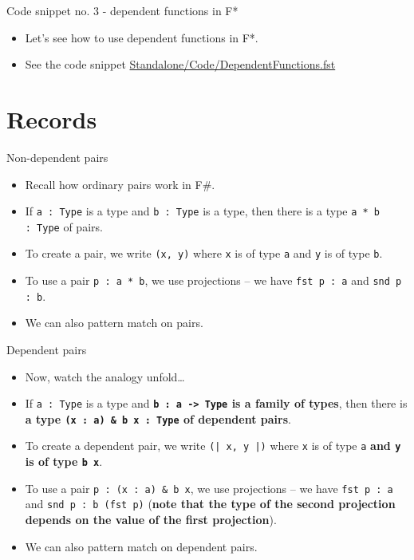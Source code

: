 \documentclass{beamer}
\newcommand{\m}[1]{\texttt{#1}}
\begin{document}
\begin{frame}{Code snippet no. 3 - dependent functions in F*}
\begin{itemize}
	\item Let's see how to use dependent functions in F*.
	\item See the code snippet \href{https://github.com/wkolowski/Dependent-Types-and-Theorem-Proving/blob/master/Standalone/Code/DependentFunctions.fst}{Standalone/Code/DependentFunctions.fst}
\end{itemize}
\end{frame}

\section{Records}

\begin{frame}{Non-dependent pairs}
\begin{itemize}
	\item Recall how ordinary pairs work in F\#.
	\item If \m{a :\ Type} is a type and \m{b :\ Type} is a type, then there is a type \m{a * b :\ Type} of pairs.
	\item To create a pair, we write \m{(x, y)} where \m{x} is of type \m{a} and \m{y} is of type \m{b}.
	\item To use a pair \m{p :\ a * b}, we use projections -- we have \m{fst p :\ a} and \m{snd p :\ b}.
	\item We can also pattern match on pairs.
\end{itemize}
\end{frame}

\begin{frame}{Dependent pairs}
\begin{itemize}
	\item Now, watch the analogy unfold\dots
	\item If \m{a :\ Type} is a type and \textbf{\m{b :\ a -> Type} is a family of types}, then there is \textbf{a type \m{(x :\ a) \& b x :\ Type} of dependent pairs}.
	\item To create a dependent pair, we write \m{(| x, y |)} where \m{x} is of type \m{a} \textbf{and \m{y} is of type \m{b x}}.
	\item To use a pair \m{p :\ (x :\ a) \& b x}, we use projections -- we have \m{fst p :\ a} and \m{snd p :\ b (fst p)} (\textbf{note that the type of the second projection depends on the value of the first projection}).
	\item We can also pattern match on dependent pairs.
\end{itemize}
\end{frame}
\end{document}
